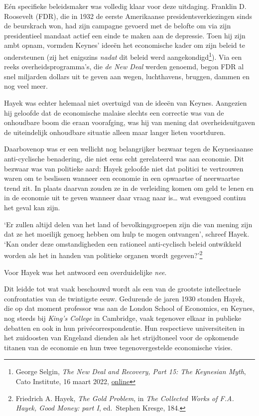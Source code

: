 \documentclass[
  a5paper,
  smalldemyvopaper,11pt,twoside,onecolumn,openright,extrafontsizes,
hidelinks]{memoir}
\begin{document}
Eén specifieke beleidsmaker was volledig klaar voor deze uitdaging.
Franklin D. Roosevelt (FDR), die in 1932 de eerste Amerikaanse
presidentsverkiezingen sinds de beurskrach won, had zijn campagne
gevoerd met de belofte om via zijn presidentieel mandaat actief een
einde te maken aan de depressie. Toen hij zijn ambt opnam, vormden
Keynes' ideeën het economische kader om zijn beleid te ondersteunen (zij
het enigszins \emph{nadat} dit beleid werd aangekondigd\footnote{\hspace{0pt}George
  Selgin, \emph{The New Deal and Recovery, Part 15: The Keynesian Myth},
  Cato Institute, 16 maart 2022,
  \href{https://www.cato.org/blog/new-deal-recovery-part-15-keynesian-myth.}{online}}).
Via een reeks overheidsprogramma's, die \emph{de New Deal} werden
genoemd, begon FDR al snel miljarden dollars uit te geven aan wegen,
luchthavens, bruggen, dammen en nog veel meer.

Hayek was echter helemaal niet overtuigd van de ideeën van Keynes.
Aangezien hij geloofde dat de economische malaise slechts een correctie
was van de onhoudbare boom die eraan voorafging, was hij van mening dat
overheidsuitgaven de uiteindelijk onhoudbare situatie alleen maar langer
lieten voortduren.

Daarbovenop was er een wellicht nog belangrijker bezwaar tegen de
Keynesiaanse anti-cyclische benadering, die niet eens echt gerelateerd
was aan economie. Dit bezwaar was van politieke aard: Hayek geloofde
niet dat politici te vertrouwen waren om te beslissen wanneer een
economie in een opwaartse of neerwaartse trend zit. In plaats daarvan
zouden ze in de verleiding komen om geld te lenen en in de economie uit
te geven wanneer daar vraag naar is\ldots{} wat evengoed continu het
geval kan zijn.

`Er zullen altijd delen van het land of bevolkingsgroepen zijn die van
mening zijn dat ze het moeilijk genoeg hebben om hulp te mogen
ontvangen', schreef Hayek. `Kan onder deze omstandigheden een rationeel
anti-cyclisch beleid ontwikkeld worden als het in handen van politieke
organen wordt gegeven?'\footnote{\hspace{0pt}Friedrich A. Hayek,
  \emph{The Gold Problem}, in \emph{The Collected Works of F.A. Hayek,
  Good Money: part I}, ed.~Stephen Kresge, 184.}

Voor Hayek was het antwoord een overduidelijke \emph{nee}.

Dit leidde tot wat vaak beschouwd wordt als een van de grootste
intellectuele confrontaties van de twintigste eeuw. Gedurende de jaren
1930 stonden Hayek, die op dat moment professor was aan de London School
of Economics, en Keynes, nog steeds bij \emph{King's College} in
Cambridge, vaak tegenover elkaar in publieke debatten en ook in hun
privécorrespondentie. Hun respectieve universiteiten in het zuidoosten
van Engeland dienden als het strijdtoneel voor de opkomende titanen van
de economie en hun twee tegenovergestelde economische visies.
\end{document}
